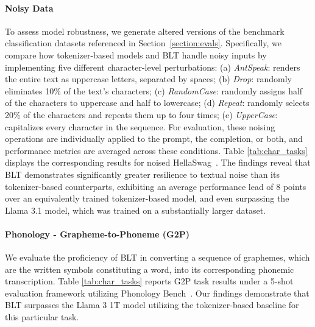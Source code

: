 \paragraph{Noisy Data} To assess model robustness, we generate altered versions of the benchmark classification datasets referenced in Section~\ref{section:evals}. Specifically, we compare how tokenizer-based models and {\textsc BLT} handle noisy inputs by implementing five different character-level perturbations: (a) \textit{AntSpeak}: renders the entire text as uppercase letters, separated by spaces; (b) \textit{Drop}: randomly eliminates 10\% of the text’s characters; (c) \textit{RandomCase}: randomly assigns half of the characters to uppercase and half to lowercase; (d) \textit{Repeat}: randomly selects 20\% of the characters and repeats them up to four times; (e) \textit{UpperCase}: capitalizes every character in the sequence. For evaluation, these noising operations are individually applied to the prompt, the completion, or both, and performance metrics are averaged across these conditions. Table \ref{tab:char_tasks} displays the corresponding results for noised HellaSwag~\citep{Eval_hellaswag}. The findings reveal that {\textsc BLT} demonstrates significantly greater resilience to textual noise than its tokenizer-based counterparts, exhibiting an average performance lead of 8 points over an equivalently trained tokenizer-based model, and even surpassing the Llama 3.1 model, which was trained on a substantially larger dataset.

\paragraph{Phonology - Grapheme-to-Phoneme (G2P)} We evaluate the proficiency of {\textsc BLT} in converting a sequence of graphemes, which are the written symbols constituting a word, into its corresponding phonemic transcription. Table \ref{tab:char_tasks} reports G2P task results under a 5-shot evaluation framework utilizing Phonology Bench~\citep{suvarna2024phonologybench}. Our findings demonstrate that {\textsc BLT} surpasses the Llama 3 1T model utilizing the tokenizer-based baseline for this particular task.

